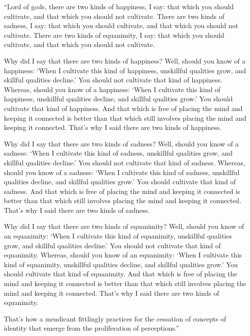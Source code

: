 \documentclass[12pt,openany]{book}%
\begin{document}
“Lord of gods, there are two kinds of happiness, I say: that which you should cultivate, and that which you should not cultivate. There are two kinds of sadness, I say: that which you should cultivate, and that which you should not cultivate. There are two kinds of equanimity, I say: that which you should cultivate, and that which you should not cultivate. 

Why did I say that there are two kinds of happiness? Well, should you know of a happiness: ‘When I cultivate this kind of happiness, unskillful qualities grow, and skillful qualities decline.’ You should not cultivate that kind of happiness. Whereas, should you know of a happiness: ‘When I cultivate this kind of happiness, unskillful qualities decline, and skillful qualities grow.’ You should cultivate that kind of happiness. And that which is free of placing the mind and keeping it connected is better than that which still involves placing the mind and keeping it connected. That’s why I said there are two kinds of happiness. 

Why did I say that there are two kinds of sadness? Well, should you know of a sadness: ‘When I cultivate this kind of sadness, unskillful qualities grow, and skillful qualities decline.’ You should not cultivate that kind of sadness. Whereas, should you know of a sadness: ‘When I cultivate this kind of sadness, unskillful qualities decline, and skillful qualities grow.’ You should cultivate that kind of sadness. And that which is free of placing the mind and keeping it connected is better than that which still involves placing the mind and keeping it connected. That’s why I said there are two kinds of sadness. 

Why did I say that there are two kinds of equanimity? Well, should you know of an equanimity: ‘When I cultivate this kind of equanimity, unskillful qualities grow, and skillful qualities decline.’ You should not cultivate that kind of equanimity. Whereas, should you know of an equanimity: ‘When I cultivate this kind of equanimity, unskillful qualities decline, and skillful qualities grow.’ You should cultivate that kind of equanimity. And that which is free of placing the mind and keeping it connected is better than that which still involves placing the mind and keeping it connected. That’s why I said there are two kinds of equanimity. 

That’s how a mendicant fittlingly practices for the cessation of concepts of identity that emerge from the proliferation of perceptions.” 
\end{document}

